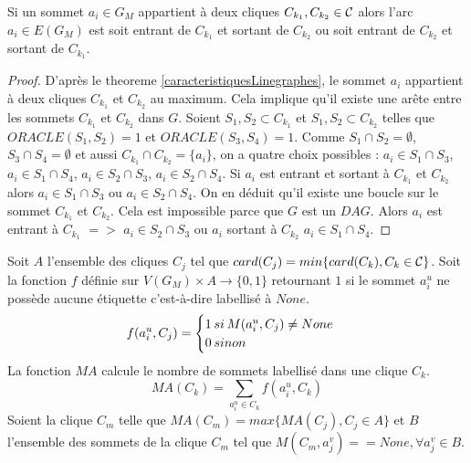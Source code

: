 \begin{theorem}
\label{arcsentrantsSortants}
Si un sommet $a_i \in G_M$ appartient \`a deux cliques $C_{k_1}, C_{k_2} \in {\cal C}$ alors 
l'arc  $a_i \in E(G_M)$ est soit entrant de $C_{k_1}$  et sortant de $C_{k_2}$ ou soit entrant de $C_{k_2}$  et sortant de $C_{k_1}$.
\end{theorem}

\begin{proof}
D'apr\`es le theoreme \ref{caracteristiquesLinegraphes}, le sommet $a_i$ appartient \`a deux cliques $C_{k_1}$ et $C_{k_2}$ au maximum. 
Cela implique qu'il existe une ar\^ete entre les sommets $C_{k_1}$ et $C_{k_2}$ dans $G$.
Soient $S_1, S_2 \subset C_{k_1}$ et $S_1, S_2 \subset C_{k_2}$ telles que $ORACLE(S_1, S_2) = 1$ et $ORACLE(S_3, S_4) = 1$.
Comme  $S_1 \cap S_2 = \emptyset$, $S_3 \cap S_4 = \emptyset$ et aussi  $C_{k_1} \cap C_{k_2} = \{a_i\}$, on a quatre choix possibles :
$a_i \in S_1 \cap S_3$, $a_i \in S_1 \cap S_4$, $a_i \in S_2 \cap S_3$, $a_i \in S_2 \cap S_4$.
\newline
Si $a_i$ est entrant et sortant \`a $C_{k_1}$ et $C_{k_2}$ alors $a_i \in S_1 \cap S_3$ ou  $a_i \in S_2 \cap S_4$. 
On en d\'eduit qu'il existe une boucle sur le sommet $C_{k_1}$ et $C_{k_2}$. 
Cela est impossible parce que $G$ est un $DAG$. 
\newline
Alors $a_i$ est entrant \`a $C_{k_1}$ $=>$ $a_i \in S_2 \cap S_3$ ou  $a_i$ sortant \`a $C_{k_2}$  $a_i \in S_1 \cap S_4$. 
\end{proof}

Soit $A$ l'ensemble des cliques $C_j$ tel que $card(C_j) = min\{ card(C_k), C_k \in {\cal C}\}$.
\newline
Soit la fonction $f$ d\'efinie sur $ V(G_M) \times A \rightarrow \{0,1\}$ retournant $1$ si le sommet $a_i^u$ ne poss\`ede aucune \'etiquette c'est-\`a-dire labellis\'e \`a $None$.
$$ f(a_i^u, C_j) = \begin{cases} 1 \hspace{0.2 em} si \hspace{0.2 em} M(a_i^u, C_j) \ne None \\ 0 \hspace{0.2 em} sinon \end{cases}$$
La fonction $MA$ calcule le nombre de sommets labellis\'e dans une clique $C_k$.
$$MA(C_k) =  \sum_{a_i^u \in C_k} f(a_i^u,C_k) $$
Soient la clique $C_m$ telle que  $MA(C_m) = max\{ MA(C_j), C_j \in A\}$ et $B$ l'ensemble des sommets de la clique $C_m$ tel que $M(C_m, a_j^v) == None, \forall a_j^v \in B$. 


